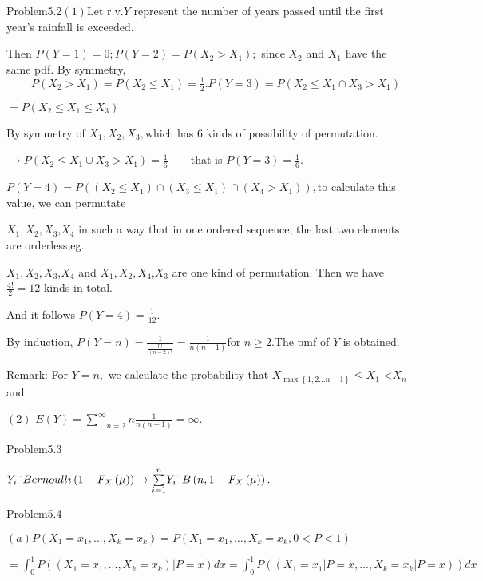 \documentclass{article}
\begin{document}
Problem5.2\qquad $\left( 1\right) $Let r.v.$Y$ represent the number of years
passed until the first year's rainfall is exceeded.

Then $P\left( Y=1\right) =0;P\left( Y=2\right) =P\left( X_{2}>X_{1}\right) ;$%
since $X_{2}$ and $X_{1}$ have the same pdf. By symmetry, \ $\qquad \
P\left( X_{2}>X_{1}\right) =P\left( X_{2}\leq X_{1}\right) =\frac{1}{2}%
.P\left( Y=3\right) =P\left( X_{2}\leq X_{1}\cap X_{3}>X_{1}\right) $

$=P\left( X_{2}\leq X_{1}\leq X_{3}\right) \qquad $

By symmetry of $X_{1},X_{2},X_{3},$which has 6 kinds of possibility of
permutation.

$\rightarrow P\left( X_{2}\leq X_{1}\cup X_{3}>X_{1}\right) =\frac{1}{6}%
\qquad $that is $P\left( Y=3\right) =\frac{1}{6}.$

\bigskip $P\left( Y=4\right) =P\left( \left( X_{2}\leq X_{1}\right) \cap
\left( X_{3}\leq X_{1}\right) \cap \left( X_{4}>X_{1}\right) \right) ,$to
calculate this value, we can permutate

$X_{1},X_{2},X_{3}$,$X_{4}$ in such a way that in one ordered sequence, the
last two elements are orderless,eg.

$X_{1},X_{2},X_{3}$,$X_{4}$ and $X_{1},X_{2},X_{4}$,$X_{3}$ are one kind of
permutation. Then we have $\frac{4!}{2}=12$ kinds in total.

And it follows $P\left( Y=4\right) =\frac{1}{12}.$

By induction, $P\left( Y=n\right) =\frac{1}{\frac{n!}{\left( n-2\right) !}}=%
\frac{1}{n\left( n-1\right) }$for $n\geq 2.$The pmf of $Y$ is obtained$.$

Remark: For $Y=n,$ we calculate the probability that $X_{\max \left\{
1,2...n-1\right\} }\leq X_{1}$ {<}$X_{n}$and 

$\left( 2\right) $ $E\left( Y\right) =\underset{n=2}{\overset{\infty }{\sum }%
}n\frac{1}{n\left( n-1\right) }=\infty .$

Problem5.3

$Y_{i}\symbol{126}Bernoulli\left( 1-F_{X}\left( \mu \right) \right)
\rightarrow \underset{i=1}{\overset{n}{\sum }}Y_{i}\symbol{126}B\left(
n,1-F_{X}\left( \mu \right) \right) .$

\bigskip Problem5.4

$\left( a\right) P\left( X_{1}=x_{1},...,X_{k}=x_{k}\right) =P\left(
X_{1}=x_{1},...,X_{k}=x_{k},0<P<1\right) $

$=\int_{0}^{1}P\left( \left( X_{1}=x_{1},...,X_{k}=x_{k}\right) |P=x\right)
dx=\int_{0}^{1}P\left( \left( X_{1}=x_{1}|P=x,...,X_{k}=x_{k}|P=x\right)
\right) dx$
\end{document}

